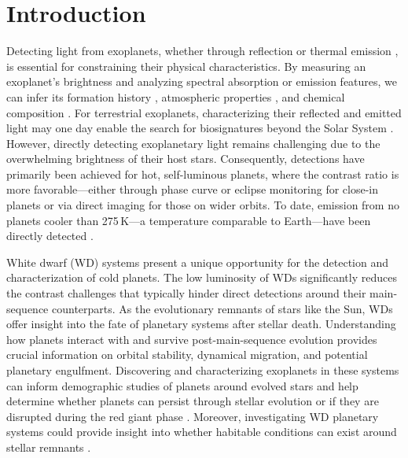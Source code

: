 \documentclass[twocolumn]{aastex631}
\begin{document}

\section{Introduction} \label{sec:intro}

Detecting light from exoplanets, whether through reflection \citep{2009Natur.459..543S,2009Sci...325..709B,2009A&A...501L..23A} or thermal emission \citep[e.g.,][]{2005Natur.434..740D,2005ApJ...626..523C, Lagrange2010,2010Natur.468.1080M}, is essential for constraining their physical characteristics. By measuring an exoplanet’s brightness and analyzing spectral absorption or emission features, we can infer its formation history \citep{2022ApJ...934...74M}, atmospheric properties \citep{2007Natur.447..183K}, and chemical composition \citep{2007Natur.445..892R,2023Natur.614..659R}. For terrestrial exoplanets, characterizing their reflected and emitted light may one day enable the search for biosignatures beyond the Solar System \citep{2020arXiv200106683G,2022A&A...664A..21Q}. However, directly detecting exoplanetary light remains challenging due to the overwhelming brightness of their host stars. Consequently, detections have primarily been achieved for hot, self-luminous planets, where the contrast ratio is more favorable—either through phase curve or eclipse monitoring for close-in planets or via direct imaging for those on wider orbits. To date, emission from no planets cooler than 275\,K—a temperature comparable to Earth—have been directly detected \citep{2024Natur.633..789M}.

White dwarf (WD) systems present a unique opportunity for the detection and characterization of cold planets. The low luminosity of WDs significantly reduces the contrast challenges that typically hinder direct detections around their main-sequence counterparts. As the evolutionary remnants of stars like the Sun, WDs offer insight into the fate of planetary systems after stellar death. Understanding how planets interact with and survive post-main-sequence evolution provides crucial information on orbital stability, dynamical migration, and potential planetary engulfment. Discovering and characterizing exoplanets in these systems can inform demographic studies of planets around evolved stars \citep{2005ApJ...633.1168D,veras2021planetary,2023A&A...675A.184L,2024AJ....167..257P} and help determine whether planets can persist through stellar evolution or if they are disrupted during the red giant phase \citep{2002ApJ...572..556D,2010ApJ...722..725Z}. Moreover, investigating WD planetary systems could provide insight into whether habitable conditions can exist around stellar remnants \citep{2011ApJ...731L..31A,2012ApJ...757L..15F,2013AsBio..13..279B,2013MNRAS.432L..11L,2018ApJ...862...69K,2020ApJ...894L...6K,2023ApJ...945L..24B,2024arXiv240603189Z}. 
\end{document}
